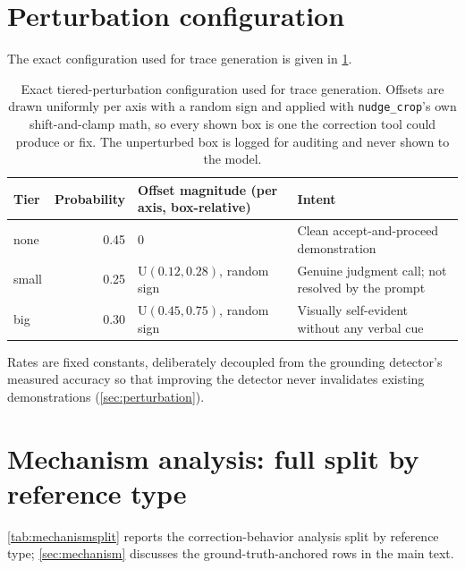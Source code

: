 \appendix

\section{Perturbation configuration}
\label{app:perturbation}

The exact configuration used for trace generation is given in \cref{tab:perturbconfig}.

\begin{table}[htbp]
  \centering
  \small
  \caption{Exact tiered-perturbation configuration used for trace generation. Offsets are drawn
  uniformly per axis with a random sign and applied with \texttt{nudge\_crop}'s own
  shift-and-clamp math, so every shown box is one the correction tool could produce or fix. The unperturbed box is logged for auditing and
  never shown to the model.}
  \label{tab:perturbconfig}
  \footnotesize
  \setlength{\tabcolsep}{4pt}
  \begin{tabular}{@{}lrp{3.9cm}p{4.6cm}@{}}
    \toprule
    Tier & Probability & Offset magnitude (per axis, box-relative) & Intent \\
    \midrule
    none & 0.45 & $0$ & Clean accept-and-proceed demonstration \\
    small & 0.25 & $\mathrm{U}(0.12, 0.28)$, random sign & Genuine judgment call; not resolved by the prompt \\
    big & 0.30 & $\mathrm{U}(0.45, 0.75)$, random sign & Visually self-evident without any verbal cue \\
    \bottomrule
  \end{tabular}
\end{table}

Rates are fixed constants, deliberately decoupled from the grounding detector's measured
accuracy so that improving the detector never invalidates existing demonstrations
(\cref{sec:perturbation}).

\section{Mechanism analysis: full split by reference type}
\label{app:mechanism}

\cref{tab:mechanismsplit} reports the correction-behavior analysis split by reference type;
\cref{sec:mechanism} discusses the ground-truth-anchored rows in the main text.


